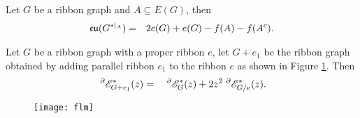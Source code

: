 \begin{thm}\cite{Mof12}\label{d}
Let $G$ be a ribbon graph and $A\subseteq E(G)$, then
\begin{eqnarray}\label{d0}
{\mathfrak{eu}}(G^{*|_{ A}})&=&2c(G)+e(G)-f(A)-f(A^{c}).
\end{eqnarray}

\end{thm}

\begin{thm}\label{1011}
Let $G$ be a ribbon graph with a  proper ribbon $e$,  let $G+e_{1}$ be the ribbon graph obtained by adding  parallel ribbon $e_1$ to the ribbon $e$  as shown in Figure \ref{flm}. Then
\begin{eqnarray}\label{dm0}
~^{\partial}{{\mathscr{E}}}^{*}_{G+ e_{1}}(z)&=&~^{\partial}{{\mathscr{E}}}^{*}_{G}(z)
+2z^{2}~^{\partial}{{\mathscr{E}}}^{*}_{G/ e}(z).
\end{eqnarray}
\end{thm}
\begin{figure}[h]
  \begin{minipage}[t]{0.6\textwidth}
  \centering
  \texttt{[image: flm]}

  \end{minipage}

  \caption{}
   \label{flm}
  \end{figure}


